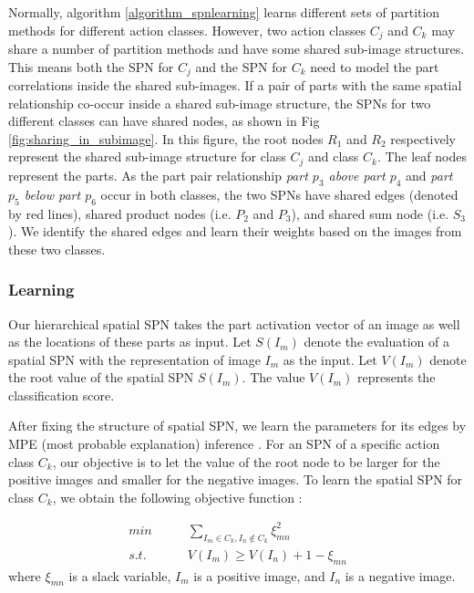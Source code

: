 \documentclass[journal]{IEEEtran}
\begin{document}
Normally, algorithm \ref{algorithm_spnlearning} learns different sets of partition methods for different action classes. However, two action classes $ C_j $ and $ C_k $ may share a number of partition methods and have some shared sub-image structures. This means both the SPN for $ C_j $ and the SPN for $ C_k $ need to model the part correlations inside the shared sub-images. If a pair of parts with the same spatial relationship  co-occur inside a shared sub-image structure, the SPNs for two different classes can have shared nodes, as shown in Fig \ref{fig:sharing_in_subimage}.
In this figure, the root nodes $ R_1 $ and $ R_2 $ respectively represent the shared sub-image structure for class $ C_j $ and class $ C_k $. The leaf nodes represent the parts.
As the part pair relationship \textit{part $ p_3 $ above part $ p_4 $} and \textit{part $ p_5 $ below part $ p_6 $} occur in both classes, the two SPNs have shared edges (denoted by red lines), shared product nodes (i.e. $ P_2 $ and $ P_3 $), and shared sum node (i.e. $ S_3 $). We identify the shared edges and learn their weights based on the images from these two classes.




\subsubsection{Learning}

Our hierarchical spatial SPN takes the part activation vector of an image as well as the locations of these parts as input.
Let $ S(I_m) $ denote the evaluation of a spatial SPN with the representation of image $ I_m $ as the input. Let $ V(I_m) $ denote the root value of the spatial SPN $ S(I_m) $.
The value $ V(I_m) $ represents the classification score.





After fixing the structure of spatial SPN, we learn the parameters for its edges by MPE (most probable explanation) inference \cite{Discriminative_Learning_SPNNIPS2012_4516}. For an SPN of a specific action class $ C_k $, our objective is to let the value of the root node to be larger for the positive images and smaller for the negative images. To learn the spatial SPN for class $ C_k $, we obtain the following objective function :

\begin{equation}\label{Eq:ClassSPNobjectFunction}
\begin{split}
min \qquad  &\underset{I_m \in C_k, I_n \notin C_k}{\sum} \xi_{mn}^2 \\
 s.t.\qquad &V(I_m) \geq V(I_n)+1-\xi_{mn}
\end{split}
\end{equation}
where $ \xi_{mn} $ is a slack variable, $ I_m $ is a positive image, and $ I_n $ is a negative image.
\end{document}
